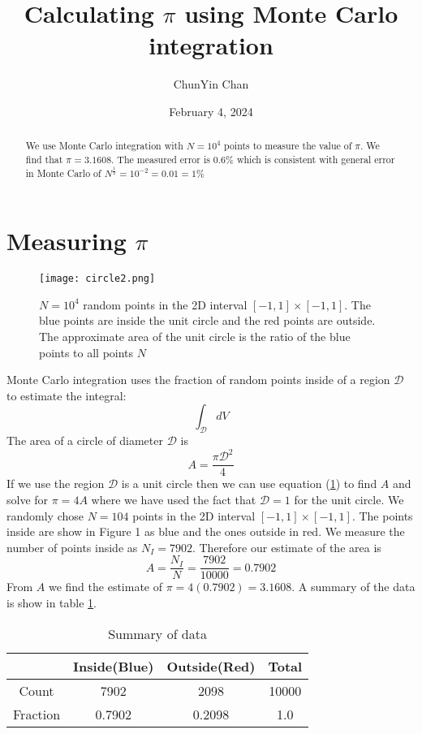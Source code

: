 \documentclass{article}
\title{Calculating $\pi$ using Monte Carlo integration}
\author{ChunYin Chan}
\date{February 4, 2024}
\begin{document}
\maketitle

\begin{abstract}
    We use Monte Carlo integration with $N = 10^4$ points to measure the value of $\pi$. We find that
$\pi = 3.1608$. The measured error is 0.6\% which is consistent with general error in Monte Carlo of $N^\frac{1}{2} = 10^{-2} = 0.01 = 1\%$
\end{abstract}

\section{Measuring $\pi$}
\begin{figure} [h!]
    \centering
    \texttt{[image: circle2.png]}
    \caption{$N = 10^4$ random points in the 2D interval $[-1, 1] \times [-1, 1]$. The blue points are inside the unit circle and the red points are outside. The approximate area of the unit circle is the ratio of the blue points to all points $N$}
    \label{fig:graph}
\end{figure} 
\newpage
Monte Carlo integration uses the fraction of random points inside of a region $\mathcal{D}$ to estimate the integral:
\begin{equation}
    \int_\mathcal{D} dV
\end{equation}
The area of a circle of diameter $\mathcal{D}$ is 
\begin{equation*}
    A = \frac{\pi\mathcal{D}^2}{4}
\end{equation*}
If we use the region $\mathcal{D}$ is a unit circle then we can use equation ({\color{red}\ref{fig:graph}}) to find $A$ and solve for $\pi = 4A$ where we have used the fact that $\mathcal{D} = 1$ for the unit circle. We randomly chose $N = 104$ points in the 2D interval $[-1, 1]\times[-1, 1]$. The points inside are show in Figure 1 as blue and the ones outside in red. We measure the number of points inside as $N_I = 7902$. Therefore our estimate of the area is
\begin{equation}
    A = \frac{N_I}{N} = \frac{7902}{10000} = 0.7902
\end{equation}
From $A$ we find the estimate of $\pi = 4(0.7902) = 3.1608$. A summary of the data is show in table {\color{red}\ref{table:1}}.
\begin{table}[htb!]
    \centering
    \begin{tabular}{|c|c|c|c|}
        \hline
        \phantom{x} & Inside(Blue) & Outside(Red) & Total \\
        \hline
        Count & 7902 & 2098 & 10000 \\
        \hline
        Fraction & 0.7902 & 0.2098 & 1.0 \\
        \hline
    \end{tabular}
    \caption{Summary of data}
    \label{table:1}
\end{table}
\end{document}
